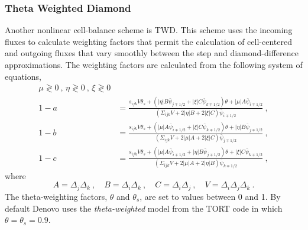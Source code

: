 \documentclass[12pt]{article}
\begin{document}
\subsubsection*{Theta Weighted Diamond}
\vspace*{-1 em}
Another nonlinear cell-balance scheme is TWD.  This scheme
uses the incoming fluxes to calculate weighting factors that permit the
calculation of cell-centered and outgoing fluxes that vary smoothly between
the step and diamond-difference approximations.  The weighting factors are
calculated from the following system of equations,
\begin{equation}
  \begin{aligned}
    \mu\gtrless0\:,\,\eta\gtrless0\:,\,\xi\gtrless0\\
    1-a &= \frac{s_{ijk}V\theta_s + (|\eta|B\bar{\psi}_{j\mp1/2} +
      |\xi|C\bar{\psi}_{k\mp1/2})\theta + |\mu|A\bar{\psi}_{i\mp1/2}}
    {(\Sigma_{ijk}V
      + 2|\eta|B + 2|\xi|C)\bar{\psi}_{i\mp1/2}}\:,\\
    1-b &= \frac{s_{ijk}V\theta_s + (|\mu|A\bar{\psi}_{i\mp1/2} +
      |\xi|C\bar{\psi}_{k\mp1/2})\theta + |\eta|B\bar{\psi}_{j\mp1/2}}
    {(\Sigma_{ijk}V
      + 2|\mu|A + 2|\xi|C)\bar{\psi}_{j\mp1/2}}\:,\\
    1-c &= \frac{s_{ijk}V\theta_s + (|\mu|A\bar{\psi}_{i\mp1/2} +
      |\eta|B\bar{\psi}_{j\mp1/2})\theta + |\xi|C\bar{\psi}_{k\mp1/2}}
    {(\Sigma_{ijk}V + 2|\mu|A + 2|\eta|B)\bar{\psi}_{k\mp1/2}}\:,
  \end{aligned}
\end{equation}
where
\begin{equation}
  A = \Delta_j\Delta_k\:,\quad B = \Delta_i\Delta_k\:,\quad C =
  \Delta_i\Delta_j\:,\quad V = \Delta_i\Delta_j\Delta_k\:.
\end{equation}
The theta-weighting factors, $\theta$ and $\theta_s$, are set to values
between 0 and 1.  By default Denovo uses the \textit{theta-weighted} model
from the TORT code in which $\theta = \theta_s = 0.9$.
\end{document}
